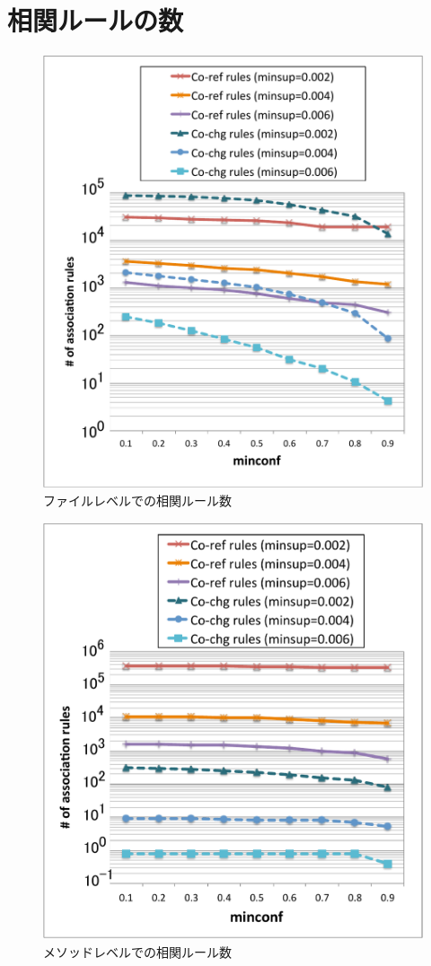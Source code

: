 \documentclass[a4paper]{jsbook}
\begin{document}
\section{相関ルールの数}\label{rulesize_sec}
\begin{figure}[p]
  \centering
  \includegraphics[width = 0.95\linewidth]{resource/rulesize_f.pdf}
  \caption{ファイルレベルでの相関ルール数}
  \label{f_rule}
\end{figure}
\begin{figure}[p]
  \centering
  \includegraphics[width = 0.95\linewidth]{resource/rulesize_m.pdf}
  \caption{メソッドレベルでの相関ルール数}
  \label{m_rule}
\end{figure}
\end{document}
